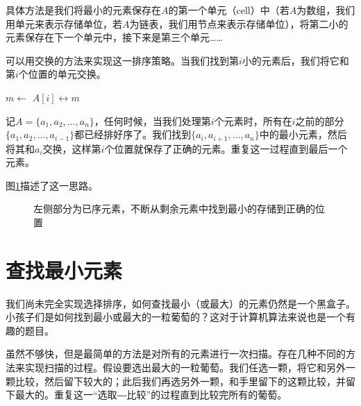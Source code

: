 \documentclass{ctexart}
\begin{document}
具体方法是我们将最小的元素保存在$A$的第一个单元（cell）中（若$A$为数组，我们用单元来表示存储单位，若$A$为链表，我们用节点来表示存储单位），将第二小的元素保存在下一个单元中，接下来是第三个单元……

可以用交换的方法来实现这一排序策略。当我们找到第$i$小的元素后，我们将它和第$i$个位置的单元交换。

\begin{algorithmic}[1]
    \State $m \gets$ 
    \State {} $A[i] \leftrightarrow m$
  \EndFor
\EndFunction
\end{algorithmic}

记$A = \{a_1, a_2, ..., a_n\}$，任何时候，当我们处理第$i$个元素时，所有在$i$之前的部分$\{a_1, a_2, ..., a_{i-1}\}$都已经排好序了。我们找到$\{a_i, a_{i+1}, ..., a_n\}$中的最小元素，然后将其和$a_i$交换，这样第$i$个位置就保存了正确的元素。重复这一过程直到最后一个元素。

图\ref{fig:in-place-ssort}描述了这一思路。

\begin{figure}[htbp]
  \centering
  \caption{左侧部分为已序元素，不断从剩余元素中找到最小的存储到正确的位置}
  \label{fig:in-place-ssort}
\end{figure}

\section{查找最小元素}

我们尚未完全实现选择排序，如何查找最小（或最大）的元素仍然是一个黑盒子。小孩子们是如何找到最小或最大的一粒葡萄的？这对于计算机算法来说也是一个有趣的题目。

虽然不够快，但是最简单的方法是对所有的元素进行一次扫描。存在几种不同的方法来实现扫描的过程。假设要选出最大的一粒葡萄。我们任选一颗，将它和另外一颗比较，然后留下较大的；此后我们再选另外一颗，和手里留下的这颗比较，并留下最大的。重复这一“选取―比较”的过程直到比较完所有的葡萄。
\end{document}
